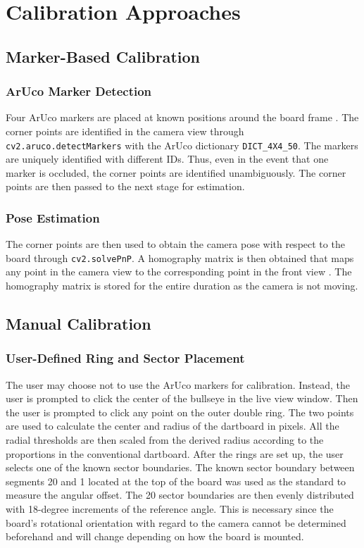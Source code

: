 \section{Calibration Approaches}

\subsection{Marker-Based Calibration}

\subsubsection{ArUco Marker Detection}
Four ArUco markers are placed at known positions around the board frame \cite{Garrido-Jurado2014}. The corner points are identified in the camera view through \texttt{cv2.aruco.detectMarkers} with the ArUco dictionary \texttt{DICT\_4X4\_50}. The markers are uniquely identified with different IDs. Thus, even in the event that one marker is occluded, the corner points are identified unambiguously. The corner points are then passed to the next stage for estimation.


\subsubsection{Pose Estimation}
The corner points are then used to obtain the camera pose with respect to the board through \texttt{cv2.solvePnP}. A homography matrix is then obtained that maps any point in the camera view to the corresponding point in the front view \cite{Hartley2004}. The homography matrix is stored for the entire duration as the camera is not moving. 

\subsection{Manual Calibration}

\subsubsection{User-Defined Ring and Sector Placement}
The user may choose not to use the ArUco markers for calibration. Instead, the user is prompted to click the center of the bullseye in the live view window. Then the user is prompted to click any point on the outer double ring. The two points are used to calculate the center and radius of the dartboard in pixels. All the radial thresholds are then scaled from the derived radius according to the proportions in the conventional dartboard.
After the rings are set up, the user selects one of the known sector boundaries. The known sector boundary between segments 20 and 1 located at the top of the board was used as the standard to measure the angular offset. The 20 sector boundaries are then evenly distributed with 18-degree increments of the reference angle. This is necessary since the board's rotational orientation with regard to the camera cannot be determined beforehand and will change depending on how the board is mounted.

